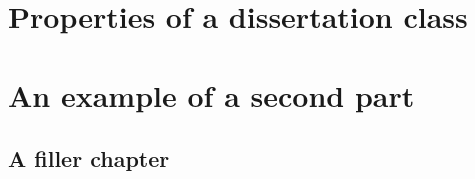 \documentclass[]{dissertation}
\begin{document}
%









%
\setcounter{colorcounter}{1}
\part[\color{thumb\arabic{thumbcounter}}Properties of a dissertation class]{Properties of a dissertation class}\label{part:first}

\lipsum[1-3]

\newpage
\chaptoc













%
\setcounter{colorcounter}{2}
\part[\color{thumb\arabic{thumbcounter}}An example of a second part]{An example of a second part}\label{part:second}


\lipsum[1-3]

\newpage
\chaptoc




\chapter{A filler chapter}
\lipsum[15-29]
\end{document}

